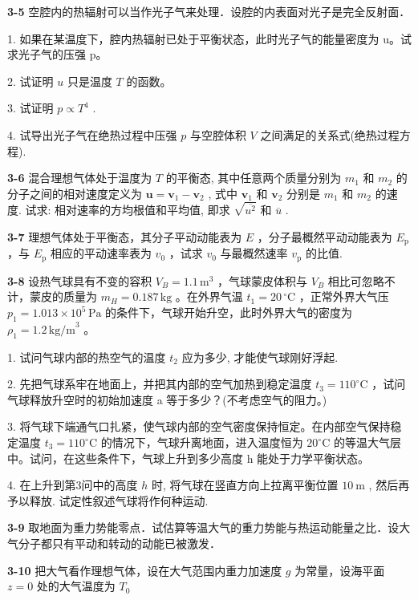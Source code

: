 \textbf{3-5} 空腔内的热辐射可以当作光子气来处理．设腔的内表面对光子是完全反射面．

1. 如果在某温度下，腔内热辐射已处于平衡状态，此时光子气的能量密度为 u。试求光子气的压强 p。

2. 试证明 $u$ 只是温度 $T$ 的函数。

3. 试证明 $p \propto T^4$ .

4. 试导出光子气在绝热过程中压强 $p$ 与空腔体积 $V$ 之间满足的关系式(绝热过程方程).
\vfill
\newpage

\textbf{3-6} 混合理想气体处于温度为 $T$ 的平衡态, 其中任意两个质量分别为 $m_{1}$ 和 $m_{2}$ 的分子之间的相对速度定义为 $\pmb{u} = \pmb{v}_{1} - \pmb{v}_{2}$ , 式中 $\pmb{v}_{1}$ 和 $\pmb{v}_{2}$ 分别是 $m_{1}$ 和 $m_{2}$ 的速度. 试求: 相对速率的方均根值和平均值, 即求 $\sqrt{\overline{u^2}}$ 和 $\overline{u}$ .
\vfill
\newpage

\textbf{3-7} 理想气体处于平衡态，其分子平动动能表为 $E$ ，分子最概然平动动能表为 $E_{\mathrm{p}}$ ，与 $E_{\mathrm{p}}$ 相应的平动速率表为 $v_{0}$ ，试求 $v_{0}$ 与最概然速率 $v_{\mathrm{p}}$ 的比值.
\vfill
\newpage

\textbf{3-8} 设热气球具有不变的容积 $V_{B} = 1.1 \, \mathrm{m}^{3}$ ，气球蒙皮体积与 $V_{B}$ 相比可忽略不计，蒙皮的质量为 $m_{H} = 0.187 \, \mathrm{kg}$ 。在外界气温 $t_{1} = 20 \, ^{\circ}\mathrm{C}$ ，正常外界大气压 $p_{1} = 1.013 \times 10^{5} \, \mathrm{Pa}$ 的条件下，气球开始升空，此时外界大气的密度为 $\rho_{1} = 1.2 \, \mathrm{kg/m}^{3}$ 。

1. 试问气球内部的热空气的温度 $t_2$ 应为多少, 才能使气球刚好浮起.

2. 先把气球系牢在地面上，并把其内部的空气加热到稳定温度 $t_{3} = 110^{\circ}\mathrm{C}$ ，试问气球释放升空时的初始加速度 a 等于多少？(不考虑空气的阻力。)

3. 将气球下端通气口扎紧，使气球内部的空气密度保持恒定。在内部空气保持稳定温度 $t_{3} = 110^{\circ}\mathrm{C}$ 的情况下，气球升离地面，进入温度恒为 $20^{\circ}\mathrm{C}$ 的等温大气层中。试问，在这些条件下，气球上升到多少高度 h 能处于力学平衡状态。

4. 在上升到第3问中的高度 $h$ 时, 将气球在竖直方向上拉离平衡位置 $10 \mathrm{~m}$ , 然后再予以释放. 试定性叙述气球将作何种运动.
\vfill
\newpage

\textbf{3-9} 取地面为重力势能零点．试估算等温大气的重力势能与热运动能量之比．设大气分子都只有平动和转动的动能已被激发．
\vfill
\newpage

\textbf{3-10} 把大气看作理想气体，设在大气范围内重力加速度 $g$ 为常量，设海平面 $z = 0$ 处的大气温度为 $T_{0}$

